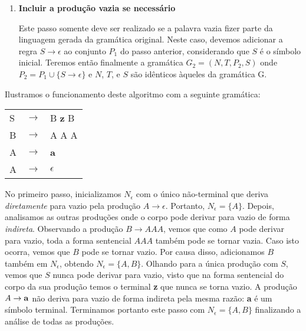 \documentclass{compiladores}
\renewcommand{\flecha}{\rightarrow}
\newcommand{\flech}{$\rightarrow$}
\begin{document}
\begin{enumerate}
\item {\bf Incluir a produção vazia se necessário}

  Este passo somente deve ser realizado se a palavra vazia fizer parte
  da linguagem gerada da gramática original. Neste caso, devemos
  adicionar a regra $S \flecha \epsilon$ ao conjunto $P_1$ do passo
  anterior, considerando que $S$ é o símbolo inicial. Teremos então
  finalmente a gramática $G_2 = (N, T, P_2, S)$ onde $P_2 = P_1 \cup
  \{ S \flecha \epsilon \}$ e $N$, $T$, e $S$ são idênticos àqueles da
  gramática G.
\end{enumerate}

Ilustramos o funcionamento deste algoritmo com a seguinte gramática:

\begin{center}
\begin{tabular}{lll}
S & \flech & B {\bf z} B \\
B & \flech & A A A \\
A & \flech & {\bf a} \\
A & \flech & $\epsilon$ \\
\end{tabular}
\end{center}

No primeiro passo, inicializamos $N_\epsilon$ com o único não-terminal
que deriva \emph{diretamente} para vazio pela produção $A \flecha
\epsilon$. Portanto, $N_\epsilon = \{ A \}$. Depois, analisamos as
outras produções onde o corpo pode derivar para vazio de forma
\emph{indireta}. Observando a produção $B \flecha AAA$, vemos que como
$A$ pode derivar para vazio, toda a forma sentencial $AAA$ também pode
se tornar vazia. Caso isto ocorra, vemos que $B$ pode se tornar
vazio. Por causa disso, adicionamos $B$ também em $N_\epsilon$,
obtendo $N_\epsilon = \{ A, B \}$. Olhando para a única produção com
$S$, vemos que $S$ nunca pode derivar para vazio, visto que na forma
sentencial do corpo da sua produção temos o terminal {\bf z} que nunca
se torna vazio. A produção $A \flecha {\bf a}$ não deriva para vazio
de forma indireta pela mesma razão: {\bf a} é um símbolo
terminal. Terminamos portanto este passo com $N_\epsilon = \{ A, B \}$
finalizando a análise de todas as produções.
\end{document}
